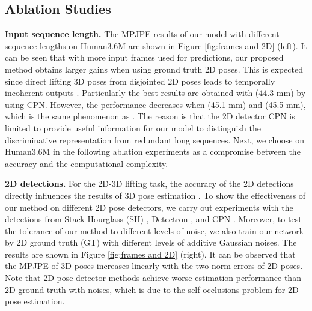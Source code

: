 \documentclass[10pt,twocolumn,letterpaper]{article}
\begin{document}
\subsection{Ablation Studies}
\textbf{Input sequence length. }
The MPJPE results of our model with different sequence lengths on Human3.6M are shown in Figure \ref{fig:frames and 2D} (left). 
It can be seen that with more input frames used for predictions, our proposed method obtains larger gains when using ground truth 2D poses. 
This is expected since direct lifting 3D poses from disjointed 2D poses leads to temporally incoherent outputs \cite{dabral2018learning}. 
Particularly the best results are obtained with  (44.3 mm) by using CPN. 
However, the performance decreases when  (45.1 mm) and  (45.5 mm), which is the same phenomenon as \cite{liu2020attention}.  
The reason is that the 2D detector CPN is limited to provide useful information for our model to distinguish the discriminative representation from redundant long sequences. 
Next, we choose  on Human3.6M in the following ablation experiments as a compromise between the accuracy and the computational complexity. 

\textbf{2D detections. }
For the 2D-3D lifting task, the accuracy of the 2D detections directly influences the results of 3D pose estimation \cite{martinez2017simple}. 
To show the effectiveness of our method on different 2D pose detectors, we carry out experiments with the detections from Stack Hourglass (SH) \cite{newell2016stacked}, Detectron \cite{pavllo20193d}, and CPN \cite{chen2018cascaded}. 
Moreover, to test the tolerance of our method to different levels of noise, we also train our network by 2D ground truth (GT) with different levels of additive Gaussian noises. 
The results are shown in Figure \ref{fig:frames and 2D} (right). 
It can be observed that the MPJPE of 3D poses increases linearly with the two-norm errors of 2D poses.
Note that 2D pose detector methods achieve worse estimation performance than 2D ground truth with noises, which is due to the self-occlusions problem for 2D pose estimation. 
\end{document}

